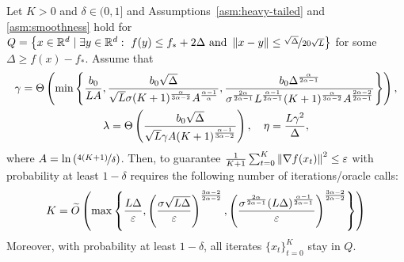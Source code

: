 \documentclass{article}
\begin{document}
\begin{theorem}\label{thm:main_result_non_cvx_main}
    Let $K > 0$ and $\delta \in (0,1]$ and Assumptions~\ref{asm:heavy-tailed} and \ref{asm:smoothness} hold for $Q = \left\{x \in \R^d \mid \exists y \in \R^d: \ f(y) \leq f_* + 2\Delta \text{ and } \norm{x - y} \leq \nicefrac{\sqrt{\Delta}}{20\sqrt{L}}\right\}$ for some $\Delta \geq f(x) - f_*$. Assume that 
    \begin{gather}
        \gamma = \Theta\left(\min\left\{\frac{b_{0}}{L A}, \frac{b_0\sqrt{\Delta}}{\sqrt{L}\sigma (K+1)^{\frac{\alpha}{3\alpha - 2}}A^{\frac{\alpha - 1}{\alpha}} }, {\color{black}\frac{b_0 \Delta^{\frac{\alpha}{2\alpha-1}}}{\sigma^{\frac{2\alpha}{2\alpha-1}} L^{\frac{\alpha-1}{2\alpha-1}} (K+1)^{\frac{\alpha}{3\alpha-2}} A^{\frac{2\alpha-2}{2\alpha-1}}}}\right\}\right),\\
        \lambda = \Theta\left(\frac{b_0\sqrt{\Delta}}{\sqrt{L}\gamma A (K+1)^{\frac{\alpha - 1}{3\alpha - 2}}}\right),\quad \eta = \frac{L\gamma^2}{\Delta},
    \end{gather}
    where $A = \ln\left(\nicefrac{4(K+1)}{\delta}\right)$. Then, to guarantee $\frac{1}{K+1}\sum_{t=0}^{K}{\left\lVert\nabla f(x_t)\right\rVert}^2 \leq \varepsilon$ with probability at least $1 - \delta$  requires the following number of iterations/oracle calls:
    \begin{equation}
        K = \widetilde{O}\left(\max\left\{ \frac{L\Delta}{\varepsilon}, \left(\frac{\sigma\sqrt{L\Delta}}{\varepsilon}\right)^{\frac{3\alpha-2}{2\alpha-2}}, \left(\frac{{\color{black}\sigma^{\frac{2\alpha}{2\alpha-1}}(L\Delta)^\frac{\alpha-1}{2\alpha - 1}}}{\varepsilon}\right)^{\frac{3\alpha-2}{2\alpha-2}} \right\}\right) \label{eq:complexity_non_cvx}
    \end{equation}
    Moreover, with probability at least $1-\delta$, all iterates $\{x_t\}_{t=0}^K$ stay in $Q$.
\end{theorem}
\end{document}
